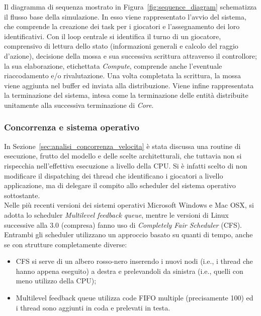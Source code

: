 Il diagramma di sequenza mostrato in Figura~\ref{fig:sequence_diagram} schematizza il flusso base della simulazione. In esso viene rappresentato l'avvio del sistema, che comprende la creazione dei task per i giocatori e l'assegnamento dei loro identificativi. Con il loop centrale si identifica il turno di un giocatore, comprensivo di lettura dello stato (informazioni generali e calcolo del raggio d'azione), decisione della mossa e sua successiva scrittura attraverso il controllore; la sua elaborazione, etichettata \emph{Compute}, comprende anche l'eventuale riaccodamento e/o rivalutazione. Una volta completata la scrittura, la mossa viene aggiunta nel buffer ed inviata alla distribuzione. Viene infine rappresentata la terminazione del sistema, intesa come la terminazione delle entità distribuite unitamente alla successiva terminazione di \emph{Core}.\\

\subsubsection{Concorrenza e sistema operativo}
\label{sec:implementazione_concorrenza_SO}

In Sezione~\ref{sec:analisi_concorrenza_velocita} è stata discussa una routine di esecuzione, frutto del modello e delle scelte architetturali, che tuttavia non si rispecchia nell'effettiva esecuzione a livello della CPU. Si è infatti scelto di non modificare il dispatching dei thread che identificano i giocatori a livello applicazione, ma di delegare il compito allo scheduler del sistema operativo sottostante.\\

Nelle più recenti versioni dei sistemi operativi Microsoft Windows e Mac OSX, si adotta lo scheduler \textit{Multilevel feedback queue}, mentre le versioni di Linux successive alla 3.0 (compresa) fanno uso di \textit{Completely Fair Scheduler} (CFS). Entrambi gli scheduler utilizzano un approccio basato su quanti di tempo, anche se con strutture completamente diverse:

\begin{itemize}
	\item CFS si serve di un albero rosso-nero inserendo i nuovi nodi (i.e., i thread che hanno appena eseguito) a destra e prelevandoli da sinistra (i.e., quelli con meno utilizzo della CPU);
	\item Multilevel feedback queue utilizza code FIFO multiple (precisamente 100) ed i thread sono aggiunti in coda e prelevati in testa.\\
\end{itemize}

